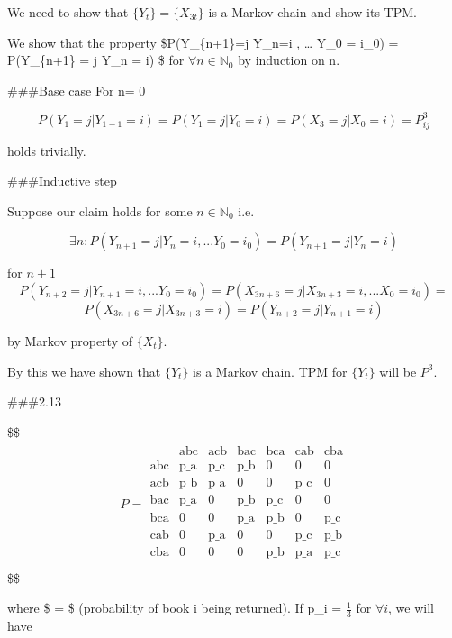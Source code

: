 \documentclass[]{article}
\begin{document}
We need to show that \(\{Y_t\} = \{X_{3t}\}\) is a Markov chain and show
its TPM.

We show that the property \$P(Y\_\{n+1\}=j \textbar{}Y\_n=i , \ldots{}
Y\_0 = i\_0) = P(Y\_\{n+1\} = j\textbar{} Y\_n = i) \$ for
\(\forall n \in \mathbb{N}_0\) by induction on n.

\#\#\#Base case For n= 0

\[
P(Y_1 = j | Y_{1-1} = i) = P(Y_1 = j | Y_0 = i) =  P(X_3 = j | X_0 = i)  = P^3_{ij}
\]

holds trivially.

\#\#\#Inductive step

Suppose our claim holds for some \(n \in \mathbb{N}_0\) i.e.

\[
\exists n: P(Y_{n+1}=j |Y_n=i , ... Y_0 = i_0) = P(Y_{n+1} = j| Y_n = i)
\]

for \(n+1\) \[
P(Y_{n+2}=j |Y_{n+1}=i , ... Y_0 = i_0) = P(X_{3n+6}=j |X_{3n+3}=i , ... X_0 = i_0) =
\] \[
P(X_{3n+6}=j |X_{3n+3}=i) = P(Y_{n+2}=j |Y_{n+1}=i)
\]

by Markov property of \(\{X_t\}\).

By this we have shown that \(\{Y_t\}\) is a Markov chain. TPM for
\(\{Y_t\}\) will be \(P^3\).

\#\#\#2.13

\$\$ \begin{align}
P = 
\begin{array}{c|c|c|c|c|c|c}
 & \text{abc} & \text{acb} & \text{bac} & \text{bca} & \text{cab}  & \text{cba}  \\ 

\text{abc} & \text{p_a} &  \text{p_c} & \text{p_b} & 0& 0&0 \\

\text{acb}& \text{p_b} & \text{p_a} & 0 & 0  & \text{p_c} & 0  \\
\text{bac} & \text{p_a} & 0 & \text{p_b} & \text{p_c} & 0 & 0 \\
\text{bca} & 0 & 0 & \text{p_a} & \text{p_b} & 0 & \text{p_c}  \\
\text{cab} & 0 & \text{p_a} & 0 & 0 & \text{p_c}  & \text{p_b} \\
\text{cba}  & 0 & 0 & 0 & \text{p_b} & \text{p_a} & \text{p_c}  \\ 
\end{array} 
\end{align} \$\$

where \$ = \$ (probability of book i being returned). If p\_i
= \(\frac{1}{3}\) for \(\forall i\), we will have
\end{document}
